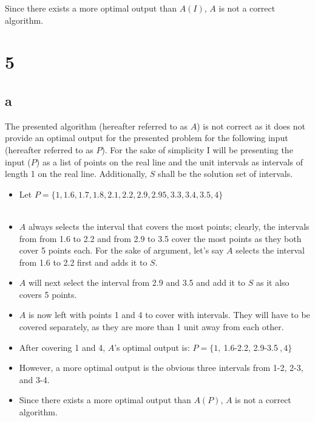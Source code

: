 \documentclass[letterpaper,notitlepage,twoside]{article}
\begin{document}
Since there exists a more optimal output than $A(I)$, $A$ is not a correct algorithm.
\section*{5}
\subsection*{a}
The presented algorithm (hereafter referred to as $A$) is not correct as it does not provide an optimal output for the presented problem for the following input (hereafter referred to as $P$). For the sake of simplicity I will be presenting the input ($P$) as a list of points on the real line and the unit intervals as intervals of length 1 on the real line. Additionally, $S$ shall be the solution set of intervals.
\begin{itemize}
	\item Let $P = \{1, 1.6, 1.7, 1.8, 2.1, 2.2, 2.9, 2.95, 3.3, 3.4, 3.5, 4 \}$ \\\\
    \item $A$ always selects the interval that covers the most points; clearly, the intervals from from 1.6 to 2.2 and from 2.9 to 3.5 cover the most points as they both cover 5 points each. For the sake of argument, let's say $A$ selects the interval from 1.6 to 2.2 first and adds it to $S$.
    \item $A$ will next select the interval from 2.9 and 3.5 and add it to $S$ as it also covers 5 points.
    \item $A$ is now left with points 1 and 4 to cover with intervals. They will have to be covered separately, as they are more than 1 unit away from each other.
    \item After covering 1 and 4, $A$'s optimal output is: $P = \{1, \ $1.6-2.2, 2.9-3.5$ \ , 4 \}$
    \item However, a more optimal output is the obvious three intervals from 1-2, 2-3, and 3-4.
    \item Since there exists a more optimal output than $A(P)$, $A$ is not a correct algorithm.
	
\end{itemize}
\end{document}
